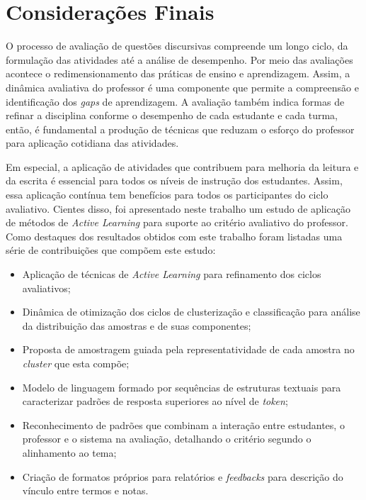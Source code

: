 \chapter{Considerações Finais}
\label{cap-conclusao}

O processo de avaliação de questões discursivas compreende um longo ciclo, da formulação das atividades até a análise de desempenho. Por meio das avaliações acontece o redimensionamento das práticas de ensino e aprendizagem. Assim, a dinâmica avaliativa do professor é uma componente que permite a compreensão e identificação dos \textit{gaps} de aprendizagem. A avaliação também indica formas de refinar a disciplina conforme o desempenho de cada estudante e cada turma, então, é fundamental a produção de técnicas que reduzam o esforço do professor para aplicação cotidiana das atividades.

Em especial, a aplicação de atividades que contribuem para melhoria da leitura e da escrita é essencial para todos os níveis de instrução dos estudantes. Assim, essa aplicação contínua tem benefícios para todos os participantes do ciclo avaliativo. Cientes disso, foi apresentado neste trabalho um estudo de aplicação de métodos de \textit{Active Learning} para suporte ao critério avaliativo do professor. Como destaques dos resultados obtidos com este trabalho foram listadas uma série de contribuições que compõem este estudo:

\begin{itemize}
  \item Aplicação de técnicas de \textit{Active Learning} para refinamento dos ciclos avaliativos;
  \item Dinâmica de otimização dos ciclos de clusterização e classificação para análise da distribuição das amostras e de suas componentes;
  \item Proposta de amostragem guiada pela representatividade de cada amostra no \textit{cluster} que esta compõe;
  \item Modelo de linguagem formado por sequências de estruturas textuais para caracterizar padrões de resposta superiores ao nível de \textit{token};
  \item Reconhecimento de padrões que combinam a interação entre estudantes, o professor e o sistema na avaliação, detalhando o critério segundo o alinhamento ao tema;
  \item Criação de formatos próprios para relatórios e \textit{feedbacks} para descrição do vínculo entre termos e notas.
\end{itemize}

